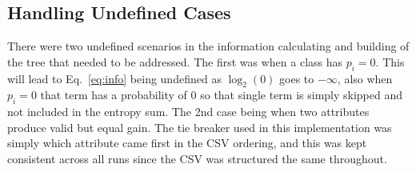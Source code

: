 \documentclass[conference]{IEEEtran}
\begin{document}
\subsection*{Handling Undefined Cases}
    There were two undefined scenarios in the information calculating and building of the tree that needed to be addressed. The first was when a class has $p_i = 0$. This will lead to Eq.~\eqref{eq:info} being undefined as $\log_2(0)$ goes to $-\infty$, also when $p_i = 0$ that term has a probability of 0 so that single term is simply skipped and not included in the entropy sum. The 2nd case being when two attributes produce valid but equal gain. The tie breaker used in this implementation was simply which attribute came first in the CSV ordering, and this was kept consistent across all runs since the CSV was structured the same throughout.
\end{document}
